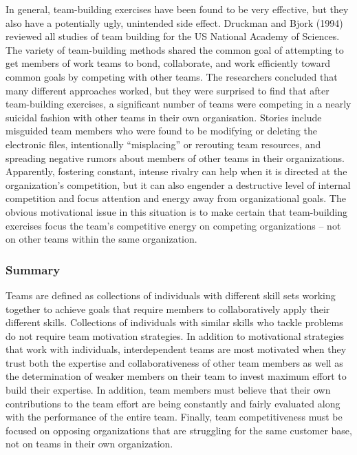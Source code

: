 In general, team-building exercises have been found to be very effective, but they also have a potentially ugly, unintended side effect. Druckman and Bjork (1994) reviewed all studies of team building for the US National Academy of Sciences. The variety of team-building methods shared the common goal of attempting to get members of work teams to bond, collaborate, and work efficiently toward common goals by competing with other teams. The researchers concluded that many different approaches worked, but they were surprised to find that after team-building exercises, a significant number of teams were competing in a nearly suicidal fashion with other teams in their own organisation. Stories include misguided team members who were found to be modifying or deleting the electronic files, intentionally ``misplacing'' or rerouting team resources, and spreading negative rumors about members of other teams in their organizations. Apparently, fostering constant, intense rivalry can help when it is directed at the organization’s competition, but it can also engender a destructive level of internal competition and focus attention and energy away from organizational goals. The obvious motivational issue in this situation is to make certain that team-building exercises focus the team’s competitive energy on competing organizations -- not on other teams within the same organization.

\subsubsection{Summary}

Teams are defined as collections of individuals with different skill sets working together to achieve goals that require members to collaboratively apply their different skills. Collections of individuals with similar skills who tackle problems do not require team motivation strategies. In addition to motivational strategies that work with individuals, interdependent teams are most motivated when they trust both the expertise and collaborativeness of other team members as well as the determination of weaker members on their team to invest maximum effort to build their expertise. In addition, team members must believe that their own contributions to the team effort are being constantly and fairly evaluated along with the performance of the entire team. Finally, team competitiveness must be focused on opposing organizations that are struggling for the same customer base, not on teams in their own organization.